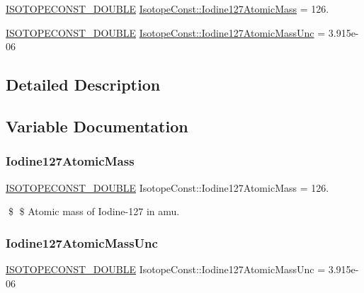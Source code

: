 \begin{DoxyCompactItemize}
\item 
\mbox{\hyperlink{group___isotope_const-_macros_ga8f45a7272ce02c0b4c65c44636ed719a}{I\+S\+O\+T\+O\+P\+E\+C\+O\+N\+S\+T\+\_\+\+D\+O\+U\+B\+LE}} \mbox{\hyperlink{group___isotope_const-_iodine-_i127_ga905f243e209f8fe66d5fcb9a1bd2f287}{Isotope\+Const\+::\+Iodine127\+Atomic\+Mass}} = 126.
\item 
\mbox{\hyperlink{group___isotope_const-_macros_ga8f45a7272ce02c0b4c65c44636ed719a}{I\+S\+O\+T\+O\+P\+E\+C\+O\+N\+S\+T\+\_\+\+D\+O\+U\+B\+LE}} \mbox{\hyperlink{group___isotope_const-_iodine-_i127_ga0418b8b888828b60611bf9c05789d913}{Isotope\+Const\+::\+Iodine127\+Atomic\+Mass\+Unc}} = 3.\+915e-\/06
\end{DoxyCompactItemize}


\subsection{Detailed Description}


\subsection{Variable Documentation}
\mbox{\label{group___isotope_const-_iodine-_i127_ga905f243e209f8fe66d5fcb9a1bd2f287}} 
\subsubsection{\texorpdfstring{Iodine127\+Atomic\+Mass}{Iodine127AtomicMass}}
{\footnotesize\ttfamily \mbox{\hyperlink{group___isotope_const-_macros_ga8f45a7272ce02c0b4c65c44636ed719a}{I\+S\+O\+T\+O\+P\+E\+C\+O\+N\+S\+T\+\_\+\+D\+O\+U\+B\+LE}} Isotope\+Const\+::\+Iodine127\+Atomic\+Mass = 126.}

\$ \$ Atomic mass of Iodine-\/127 in amu. \mbox{\label{group___isotope_const-_iodine-_i127_ga0418b8b888828b60611bf9c05789d913}} 
\subsubsection{\texorpdfstring{Iodine127\+Atomic\+Mass\+Unc}{Iodine127AtomicMassUnc}}
{\footnotesize\ttfamily \mbox{\hyperlink{group___isotope_const-_macros_ga8f45a7272ce02c0b4c65c44636ed719a}{I\+S\+O\+T\+O\+P\+E\+C\+O\+N\+S\+T\+\_\+\+D\+O\+U\+B\+LE}} Isotope\+Const\+::\+Iodine127\+Atomic\+Mass\+Unc = 3.\+915e-\/06}


